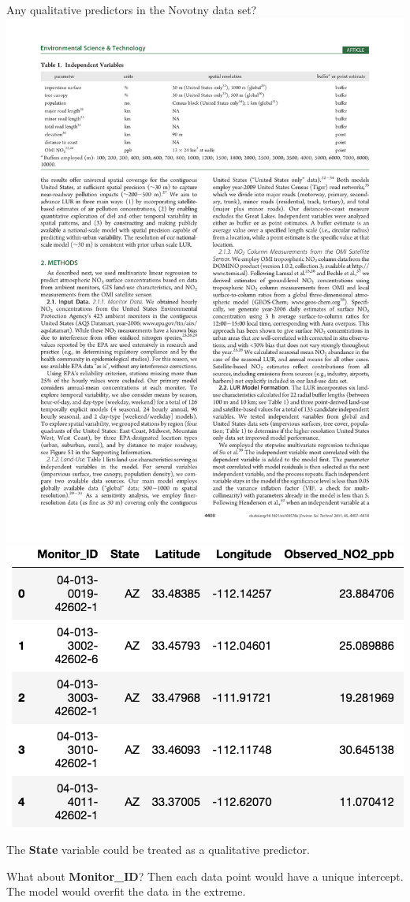 \documentclass[aspectratio=169]{beamer}
\begin{document}
\begin{frame}{Any qualitative predictors in the Novotny data set?}
\includegraphics[height=0.5\textheight]{novotny_tab1_2}
\hspace{10mm}
\includegraphics[scale=0.42]{novotny_DF}

\vspace{3mm}
The \textbf{State} variable could be treated as a qualitative predictor.

\vspace{3mm}

What about \textbf{Monitor\_ID}?  \pause Then each data point would have a unique intercept.  The model would overfit the data in the extreme.

\end{frame}
\end{document}
